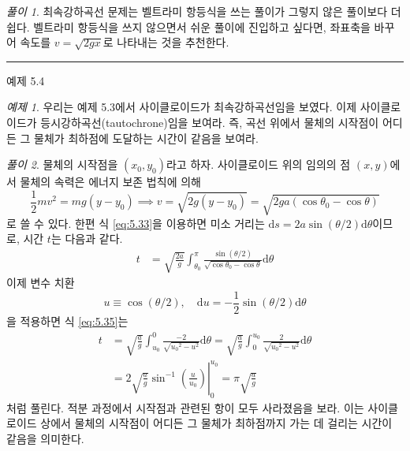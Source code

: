 \documentclass[chapter, oneside, b5paper]{oblivoir}
\theoremstyle{plain}
\theoremstyle{definition}
\theoremstyle{remark}
\newtheorem{example}{예제}[chapter]    %
\newtheorem*{solution}{풀이}
\begin{document}
\begin{solution}
    최속강하곡선 문제는 벨트라미 항등식을 쓰는 풀이가 그렇지 않은 풀이보다 더 쉽다. 벨트라미 항등식을 쓰지 않으면서 쉬운 풀이에 진입하고 싶다면, 좌표축을 바꾸어 속도를 $v=\sqrt{2gx}$로 나타내는 것을 추천한다.
\end{solution}

\noindent\rule{\textwidth}{0.8pt} %
\vspace{1em} %

\begin{examplebox}{예제 5.4}
\begin{example}
우리는 예제 5.3에서 사이클로이드가 최속강하곡선임을 보였다. 이제 사이클로이드가 등시강하곡선(tautochrone)임을 보여라. 즉, 곡선 위에서 물체의 시작점이 어디든 그 물체가 최하점에 도달하는 시간이 같음을 보여라.
\end{example}
\end{examplebox}

\begin{solution}
    물체의 시작점을 $(x_0, y_0)$라고 하자. 사이클로이드 위의 임의의 점 $(x, y)$에서 물체의 속력은 에너지 보존 법칙에 의해
    \begin{equation}
        \frac{1}{2}mv^2 = mg(y-y_0) \implies v = \sqrt{2g(y-y_0)} = \sqrt{2ga (\cos{\theta_0} - \cos{\theta})}
    \end{equation}
    로 쓸 수 있다. 한편 식 \ref{eq:5.33}을 이용하면 미소 거리는 $\mathrm{d}s = 2a\sin{(\theta/2)}\mathrm{d}\theta$이므로, 시간 $t$는 다음과 같다.
    \begin{equation}
    \begin{aligned}
        t &= \sqrt{\frac{2a}{g}} \int_{\theta_0}^{\pi} \frac{\sin{(\theta/2)}}{\sqrt{\cos{\theta_0} - \cos{\theta}}}\mathrm{d}\theta
    \end{aligned}
    \label{eq:5.35}
    \end{equation}
    이제 변수 치환
    \begin{equation*}
        u \equiv \cos{(\theta/2)}, \quad \mathrm{d}u = -\frac{1}{2}\sin{(\theta/2)}\mathrm{d}\theta
    \end{equation*}
    을 적용하면 식 \ref{eq:5.35}는
    \begin{equation}
    \begin{aligned}
        t &= \sqrt{\frac{a}{g}} \int_{u_0}^{0} \frac{-2}{\sqrt{{u_0}^2-{u}^2}}\mathrm{d}\theta = \sqrt{\frac{a}{g}} \int_{0}^{u_0} \frac{2}{\sqrt{{u_0}^2-{u}^2}}\mathrm{d}\theta \\
        &= {\left.2\sqrt{\frac{a}{g}} \sin^{-1}{\left(\frac{u}{u_0}\right)} \right|}_0^{u_0} = \pi \sqrt{\frac{a}{g}}
    \end{aligned}
    \label{eq:5.37}
    \end{equation}
    처럼 풀린다. 적분 과정에서 시작점과 관련된 항이 모두 사라졌음을 보라. 이는 사이클로이드 상에서 물체의 시작점이 어디든 그 물체가 최하점까지 가는 데 걸리는 시간이 같음을 의미한다.
\end{solution}
\end{document}
